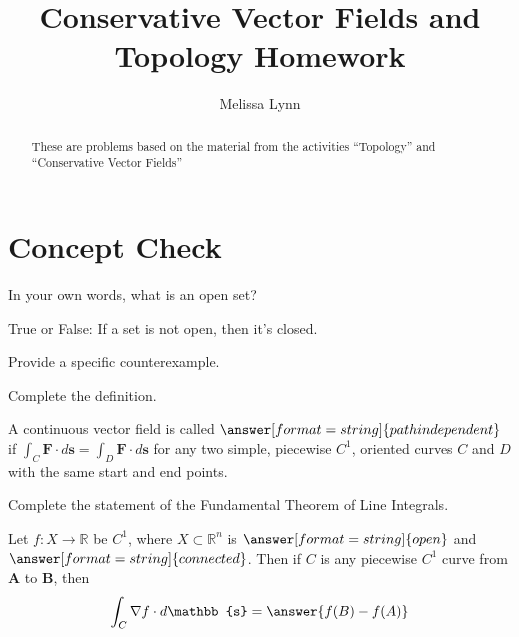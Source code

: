 \documentclass{ximera}
\title{Conservative Vector Fields and Topology Homework}
\author{Melissa Lynn}
\begin{document}
  
\begin{abstract}  
These are problems based on the material from the activities ``Topology'' and ``Conservative Vector Fields''
\end{abstract}  
\maketitle

\section{Concept Check}

\begin{problem}
In your own words, what is an open set?
\begin{freeResponse}
\end{freeResponse}
\end{problem}

\begin{problem}
True or False: If a set is not open, then it's closed.
\begin{multipleChoice}
\end{multipleChoice}
\begin{problem}
Provide a specific counterexample.
\begin{freeResponse}
\end{freeResponse}
\end{problem}
\end{problem}

\begin{problem}
Complete the definition.

A continuous vector field is called $\answer[format=string]{path independent}$ if $\int_C\mathbf{F}\cdot d\mathbf{s} = \int_D\mathbf{F}\cdot d\mathbf{s}$ for any two simple, piecewise $C^1$, oriented curves $C$ and $D$ with the same start and end points.
\end{problem}

\begin{problem}
Complete the statement of the Fundamental Theorem of Line Integrals.

Let $f:X\rightarrow\mathbb{R}$ be $C^1$, where $X\subset\mathbb{R}^n$ is $\answer[format=string]{open}$ and $\answer[format=string]{connected}$. Then if $C$ is any piecewise $C^1$ curve from $\mathbf{A}$ to $\mathbf{B}$, then
\[
\int_C\nabla f\cdot d\mathbb{s} = \answer{f(B)-f(A)}
\]
\end{problem}
\end{document}
